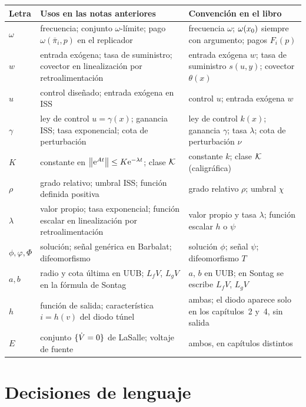 \small
\begin{tabular}{@{}>{\raggedright\arraybackslash}p{1.1cm}>{\raggedright\arraybackslash}p{5.5cm}>{\raggedright\arraybackslash}p{5.6cm}@{}}
\toprule
Letra & Usos en las notas anteriores & Convención en el libro \\
\midrule
$\omega$ & frecuencia; conjunto $\omega$-límite; pago $\omega(\bar\pi_i,p)$ en el replicador & frecuencia $\omega$; $\omega(x_0)$ siempre con argumento; pagos $F_i(p)$ \\
$w$ & entrada exógena; tasa de suministro; covector en linealización por retroalimentación & entrada exógena $w$; tasa de suministro $s(u,y)$; covector $\theta(x)$ \\
$u$ & control diseñado; entrada exógena en ISS & control $u$; entrada exógena $w$ \\
$\gamma$ & ley de control $u=\gamma(x)$; ganancia ISS; tasa exponencial; cota de perturbación & ley de control $k(x)$; ganancia $\gamma$; tasa $\lambda$; cota de perturbación $\nu$ \\
$K$ & constante en $\left\lVert \mathrm{e}^{At}\right\rVert\le K\mathrm{e}^{-\lambda t}$; clase $\mathcal{K}$ & constante $k$; clase $\mathcal{K}$ (caligráfica) \\
$\rho$ & grado relativo; umbral ISS; función definida positiva & grado relativo $\rho$; umbral $\chi$ \\
$\lambda$ & valor propio; tasa exponencial; función escalar en linealización por retroalimentación & valor propio y tasa $\lambda$; función escalar $h$ o $\psi$ \\
$\phi,\varphi,\Phi$ & solución; señal genérica en Barbalat; difeomorfismo & solución $\phi$; señal $\psi$; difeomorfismo $T$ \\
$a,b$ & radio y cota última en UUB; $L_fV$, $L_gV$ en la fórmula de Sontag & $a$, $b$ en UUB; en Sontag se escribe $L_fV$, $L_gV$ \\
$h$ & función de salida; característica $i=h(v)$ del diodo túnel & ambas; el diodo aparece solo en los capítulos~2 y~4, sin salida \\
$E$ & conjunto $\{\dot V=0\}$ de LaSalle; voltaje de fuente & ambos, en capítulos distintos \\
\bottomrule
\end{tabular}



\section*{Decisiones de lenguaje}

